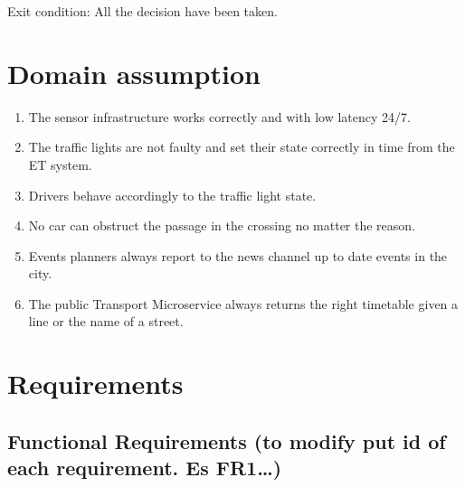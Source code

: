 \documentclass[12pt, a4paper, twoside, openright]{report}
\begin{document}
Exit condition: All the decision have been taken.

\section{Domain assumption}
\begin{enumerate}
\item
  The sensor infrastructure works correctly and with low latency 24/7.
\item
  The traffic lights are not faulty and set their state correctly in
  time from the ET system.
\item
  Drivers behave accordingly to the traffic light state.
\item
  No car can obstruct the passage in the crossing no matter the reason.
\item
  Events planners always report to the news channel up to date events in
  the city.
\item
  The public Transport Microservice always returns the right timetable
  given a line or the name of a street.
\end{enumerate}
\section{Requirements}
\subsection{Functional Requirements (to modify put id of each
  requirement. Es FR1\ldots)}
\end{document}
